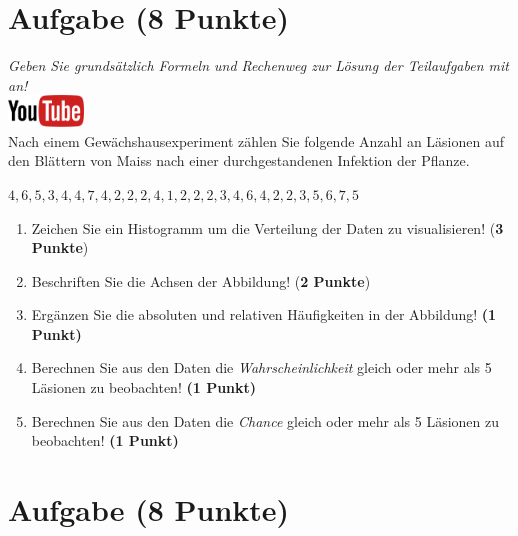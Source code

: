 \documentclass[a4paper, 9pt]{scrartcl}\usepackage[]{graphicx}\usepackage[]{xcolor}
\begin{document}
\section{Aufgabe \hfill (8 Punkte)}

\textit{Geben Sie grunds{\"a}tzlich Formeln und Rechenweg zur L{\"o}sung der
  Teilaufgaben mit an!} \\[1Ex]

\hfill\href{https://youtu.be/aXvxGC4YLqk}{\includegraphics[width =
  2cm]{img/youtube}}\\[1Ex]



Nach einem Gew{\"a}chshausexperiment z{\"a}hlen Sie folgende Anzahl an L{\"a}sionen auf den
Bl{\"a}ttern von Maiss nach einer durchgestandenen Infektion der Pflanze. 

\begin{center}
$4, 6, 5, 3, 4, 4, 7, 4, 2, 2, 2, 4, 1, 2, 2, 2, 3, 4, 6, 4, 2, 2, 3, 5, 6, 7, 5$
\end{center}

\begin{enumerate}
\item Zeichen Sie ein Histogramm um die Verteilung der Daten zu visualisieren! (\textbf{3 Punkte})
\item Beschriften Sie die Achsen der Abbildung! (\textbf{2 Punkte})
\item Erg{\"a}nzen Sie die absoluten und relativen H{\"a}ufigkeiten in der
  Abbildung! \textbf{(1 Punkt)}
\item Berechnen Sie aus den Daten die \textit{Wahrscheinlichkeit}
  gleich oder mehr als 5 L{\"a}sionen zu beobachten! \textbf{(1
    Punkt)}
\item Berechnen Sie aus den Daten die \textit{Chance} gleich oder mehr
  als 5 L{\"a}sionen zu beobachten! \textbf{(1 Punkt)}
\end{enumerate}

 
\clearpage

\section{Aufgabe \hfill (8 Punkte)}
\end{document}
